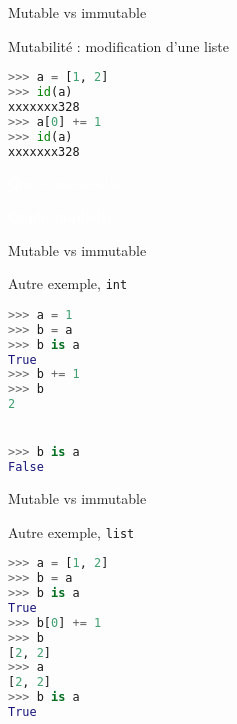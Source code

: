 \begin{frame}[fragile]{Mutable vs immutable}
  
  \begin{block}{Mutabilité : modification d'une liste}
    \medskip
\begin{lstlisting}[language=Python, morekeywords={as, True, False}, numbers=none]
>>> a = [1, 2]
>>> id(a)
xxxxxxx328
>>> a[0] += 1
>>> id(a)
xxxxxxx328
\end{lstlisting}
  \end{block}

  \textcolor{white}{Que se passe-t-il ici ?}
  \begin{center}
    \textcolor{white}{\textbf{Copie implicite}}
  \end{center}
\end{frame}








\begin{frame}[fragile]{Mutable vs immutable}
    \begin{block}{Autre exemple, \texttt{int}}
      \medskip
\begin{lstlisting}[language=Python, morekeywords={as, True, False}, numbers=none]
>>> a = 1
>>> b = a
>>> b is a
True
>>> b += 1
>>> b
2


>>> b is a
False
\end{lstlisting}
    \end{block}
\end{frame}


\begin{frame}[fragile]{Mutable vs immutable}

    \begin{block}{Autre exemple, \texttt{list}}
      \medskip
\begin{lstlisting}[language=Python, morekeywords={as, True}, numbers=none]
>>> a = [1, 2]
>>> b = a
>>> b is a
True
>>> b[0] += 1
>>> b
[2, 2]
>>> a
[2, 2]
>>> b is a
True
\end{lstlisting}
    \end{block}
\end{frame}



